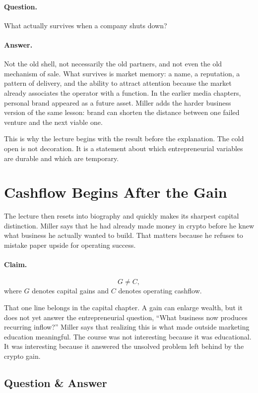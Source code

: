 \documentclass[11pt,oneside]{book}
\begin{document}
\paragraph{Question.}
What actually survives when a company shuts down?

\paragraph{Answer.}
Not the old shell, not necessarily the old partners, and not even the old mechanism of sale. What survives is market memory: a name, a reputation, a pattern of delivery, and the ability to attract attention because the market already associates the operator with a function. In the earlier media chapters, personal brand appeared as a future asset. Miller adds the harder business version of the same lesson: brand can shorten the distance between one failed venture and the next viable one.

This is why the lecture begins with the result before the explanation. The cold open is not decoration. It is a statement about which entrepreneurial variables are durable and which are temporary.

\section{Cashflow Begins After the Gain}

The lecture then resets into biography and quickly makes its sharpest capital distinction. Miller says that he had already made money in crypto before he knew what business he actually wanted to build. That matters because he refuses to mistake paper upside for operating success.

\paragraph{Claim.}
\[
G \neq C,
\]
where \(G\) denotes capital gains and \(C\) denotes operating cashflow.

That one line belongs in the capital chapter. A gain can enlarge wealth, but it does not yet answer the entrepreneurial question, ``What business now produces recurring inflow?'' Miller says that realizing this is what made outside marketing education meaningful. The course was not interesting because it was educational. It was interesting because it answered the unsolved problem left behind by the crypto gain.

\subsection{Question \& Answer}
\end{document}

